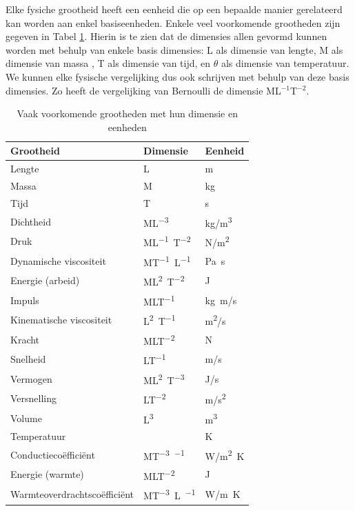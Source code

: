Elke fysiche grootheid heeft een eenheid die op een bepaalde manier gerelateerd kan worden aan enkel basiseenheden. Enkele veel voorkomende grootheden zijn gegeven in Tabel \ref{tab:grootheden}. Hierin is te zien dat de dimensies allen gevormd kunnen worden met behulp van enkele basis dimensies: L als dimensie van lengte, M als dimensie van massa , T als dimensie van tijd, en $\theta$ als dimensie van temperatuur. We kunnen elke fysische vergelijking dus ook schrijven met behulp van deze basis dimensies. Zo heeft de vergelijking van Bernoulli de dimensie ML$^{-1}$T$^{-2}$.
\begin{table}[htb]
	\centering
	\begin{tabular}{lll}
		\hline
		Grootheid                   & Dimensie   & Eenheid \\
		\hline
		Lengte                       & \unit{L}                      &   \unit{m} \\
		Massa                        & \unit{M}                      &   \unit{kg} \\
		Tijd                         & \unit{T}                      &   \unit{s} \\
		Dichtheid                    & \unit{ML^{-3}}                &   \unit{kg/m^3} \\
		Druk                         & \unit{ML^{-1}T^{-2}}          &   \unit{N/m^2} \\	
		Dynamische viscositeit       & \unit{MT^{-1}L^{-1}}          &   \unit{Pa s} \\
		Energie (arbeid)             & \unit{ML^{2}T^{-2}}           &   \unit{J} \\
		Impuls                       & \unit{MLT^{-1}}               &   \unit{kg m/s} \\
		Kinematische viscositeit     & \unit{L^{2}T^{-1}}            &   \unit{m^2/s} \\
		Kracht                       & \unit{MLT^{-2}}               &   \unit{N} \\
		Snelheid                     & \unit{LT^{-1}}                &   \unit{m/s} \\
		Vermogen                     & \unit{ML^{2}T^{-3}}           &   \unit{J/s} \\
		Versnelling                  & \unit{LT^{-2}}                &   \unit{m/s^2} \\
		Volume                       & \unit{L^3}                    &   \unit{m^3} \\
		Temperatuur                  & \unit{\theta}                 &   \unit{K} \\
		Conductiecoëfficiënt         & \unit{MT^{-3} \theta^{-1}}    &   \unit{W/m^2 K} \\	
		Energie (warmte)             & \unit{MLT^{-2}}               &   \unit{J} \\
		Warmteoverdrachtscoëfficiënt & \unit{MT^{-3}L\theta^{-1}}    &   \unit{W/m K} \\
		\hline
	\end{tabular}
	\caption{Vaak voorkomende grootheden met hun dimensie en eenheden}
	\label{tab:grootheden}
\end{table}

